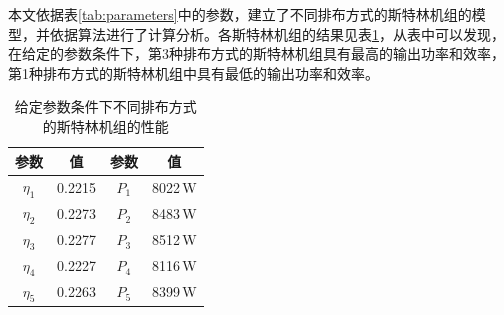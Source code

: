 本文依据表\ref{tab:parameters}中的参数，建立了不同排布方式的斯特林机组的模型，并依据算法进行了计算分析。各斯特林机组的结果见表\ref{tab:result}，从表中可以发现，在给定的参数条件下，第3种排布方式的斯特林机组具有最高的输出功率和效率，第1种排布方式的斯特林机组中具有最低的输出功率和效率。

\begin{table}[htbp]
	\caption{给定参数条件下不同排布方式的斯特林机组的性能}
	\begin{center}
	\begin{tabular}{cccc}
		\toprule
		参数		&	值	&	参数		&	值\\
		\midrule
		$\eta_1$	&	0.2215	&	$P_1$		&	8022\,W\\
		$\eta_2$	&	0.2273	&	$P_2$		&	8483\,W\\
		$\eta_3$	&	0.2277	&	$P_3$		&	8512\,W\\
		$\eta_4$	&	0.2227	&	$P_4$		&	8116\,W\\
		$\eta_5$	&	0.2263	&	$P_5$		&	8399\,W\\		
		\bottomrule
	\end{tabular}
	\end{center}
	\label{tab:result}
\end{table}

